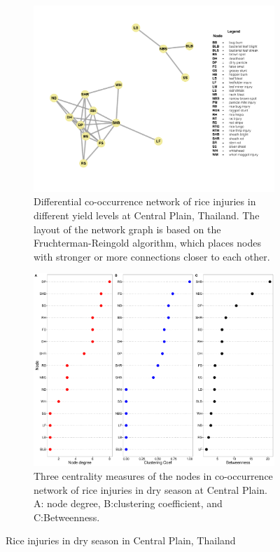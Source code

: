 

\begin{figure}
    \centering
    \begin{subfigure}[b]{1\textwidth}
        \includegraphics[width = 1\textwidth]{figures/difyieldCP.pdf}
        \caption{Differential co-occurrence network of rice injuries in different yield levels at Central Plain, Thailand. The layout of the network graph is based on the Fruchterman-Reingold algorithm, which places nodes with stronger or more connections closer to each other.}
        \label{fig:networkCP_ds}
    \end{subfigure}
    \begin{subfigure}[b]{1\textwidth}
        \includegraphics[width = 1\textwidth]{figures/yield_dif_nodepropCentral_Plain.pdf}
        \caption{Three centrality measures of the nodes in co-occurrence network of rice injuries in dry season at Central Plain. A: node degree, B:clustering coefficient, and C:Betweenness.}
        \label{fig:nodepropCP_ds}
    \end{subfigure}
    \caption{Rice injuries in dry season in Central Plain, Thailand}
    \label{fig:CP_ds}
\end{figure}
 
